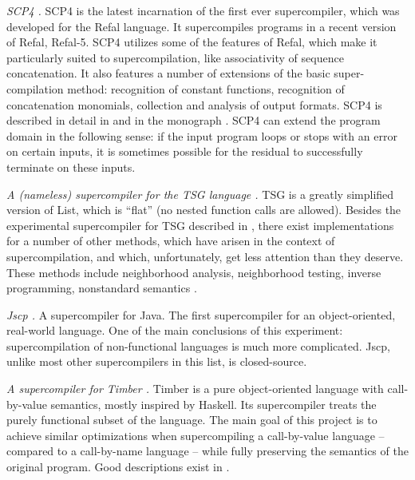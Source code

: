\begin{longitem}

\item \emph{SCP4 \cite{Scp4Url}.} SCP4 
is the latest incarnation of the first ever supercompiler, which was
developed for the Refal language. 
It supercompiles programs in a recent version of Refal, Refal-5.
SCP4 utilizes some of the features of Refal, which make it particularly
suited to supercompilation, like associativity of sequence concatenation.
It also features a number of extensions of the basic super-compilation method:
recognition of constant functions,
recognition of concatenation monomials,
collection and analysis of output formats.
SCP4 is described in detail in \cite{Nemytykh2008PhD} and in the monograph \cite{Nemytykh2007SCP4}.
SCP4 can extend the program domain in the following sense:
if the input program loops or stops with an error on certain inputs,
it is sometimes possible for the residual to successfully terminate on these inputs.

\item \emph{A (nameless) supercompiler for the  TSG language \cite{TsgUrl}.} TSG 
is a greatly simplified version of List, which is ``flat'' (no nested function calls are allowed).
Besides the experimental supercompiler for TSG described in \cite{Abramov2006meta2},
there exist implementations for a number of other methods, which have arisen 
in the context of supercompilation, and which, unfortunately, get less attention
than they deserve.
These methods include neighborhood analysis, neighborhood testing, inverse programming,
nonstandard semantics \cite{Abramov1995meta}.

\item \emph{Jscp\cite{Klimov2008Jscp} \cite{JscpUrl}.} A supercompiler for Java.
The first supercompiler for an object-oriented, real-world language.
One of the main conclusions of this experiment: supercompilation of
non-functional languages is much more complicated.
Jscp, unlike most other supercompilers in this list, is closed-source.

\item \emph{A supercompiler for Timber \cite{TimberUrl}.} Timber 
is a pure object-oriented language with call-by-value semantics, mostly inspired by Haskell.
Its supercompiler treats the purely functional subset of the language.
The main goal of this project is to achieve similar optimizations 
when supercompiling a call-by-value language -- compared to a call-by-name language --
while fully preserving the semantics of the original program.
Good descriptions exist in \cite{Jonsson2008Supercompilation,Jonsson2011Phd}.


\end{longitem}
